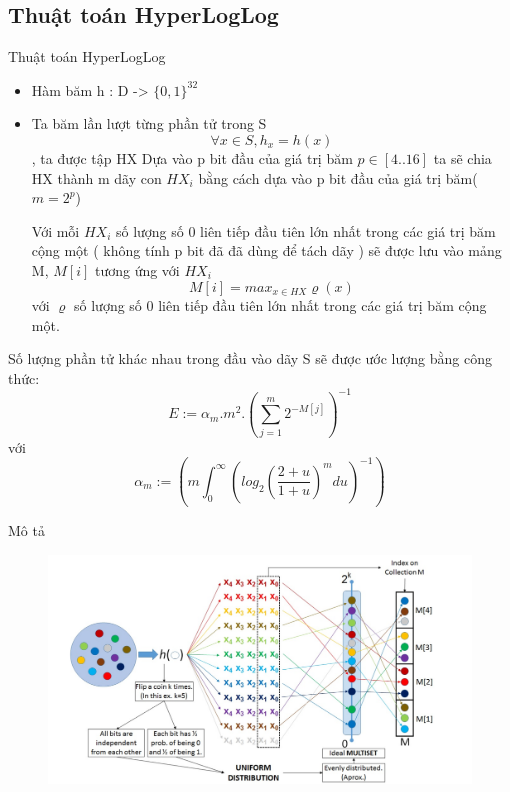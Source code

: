 \documentclass{beamer}
\begin{document}
\subsection{Thuật toán HyperLogLog}
\begin{frame}{Thuật toán HyperLogLog}
\begin{itemize}
\item Hàm băm h : D -> $\{0,1\}^{32}$ 
\item Ta băm lần lượt từng phần tử trong S $$\forall x \in S,  h_x = h(x)  $$, ta được tập HX
Dựa vào p bit đầu của giá trị băm $p \in [4..16] $ ta sẽ chia HX thành m dãy con $HX_i$ bằng cách dựa vào p bit đầu của giá trị băm($m=2^p$) 

Với mỗi $HX_i$ số lượng số 0 liên tiếp đầu tiên lớn nhất trong các giá trị băm cộng một ( không tính p bit đã đã dùng để tách dãy ) sẽ được lưu vào mảng M, $ M[i] $ tương ứng với $HX_i$
$$ M[i]=max_{x \in HX} \varrho(x)  $$ với $\varrho $ số lượng số 0 liên tiếp đầu tiên lớn nhất trong các giá trị băm cộng một.
\end{itemize}
\end{frame}
\begin{frame}
Số lượng phần tử khác nhau trong đầu vào dãy S sẽ được ước lượng bằng công thức:
$$ E:= \alpha_m .m^2.(\sum_{j=1}^m 2^{-M[j]} )^{-1}$$ với $$ \alpha_m :=(m \displaystyle \int_0^\infty  (log_2 (\dfrac{2+u}{1+u})^m du)^{-1} ) $$
\end{frame}
\begin{frame}{Mô tả}
\begin{figure}[H]
\includegraphics[scale=0.3]{HLL.png}

\end{figure}

\end{frame}
\end{document}
